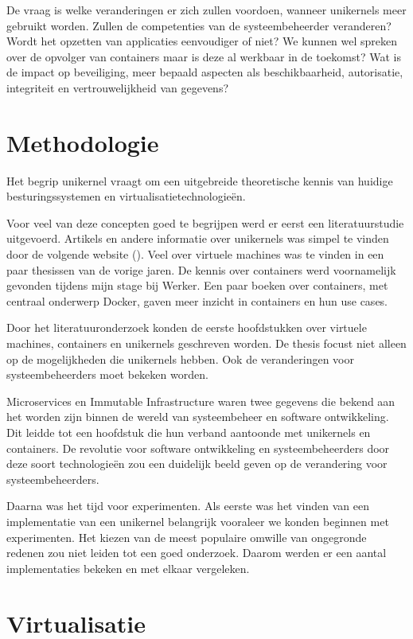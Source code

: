 \documentclass[pdftex,a4paper,12pt,twoside]{report}
\begin{document}
De vraag is welke veranderingen er zich zullen voordoen, wanneer unikernels meer gebruikt worden. Zullen de competenties van de systeembeheerder veranderen? Wordt het opzetten van applicaties eenvoudiger of niet? We kunnen wel spreken over de opvolger van containers maar is deze al werkbaar in de toekomst? Wat is de impact op beveiliging, meer bepaald aspecten als beschikbaarheid, autorisatie, integriteit en vertrouwelijkheid van gegevens?

\chapter{Methodologie}
\label{ch:methodologie}

Het begrip unikernel vraagt om een uitgebreide theoretische kennis van huidige besturingssystemen en virtualisatietechnologieën.

Voor veel van deze concepten goed te begrijpen werd er eerst een literatuurstudie uitgevoerd.
Artikels en andere informatie over unikernels was simpel te vinden door de volgende website (\cite{unikernel_systems_unikernels_2016}). Veel over virtuele machines was te vinden in een paar thesissen van de vorige jaren. De kennis over containers werd voornamelijk gevonden tijdens mijn stage bij Werker. Een paar boeken over containers, met centraal onderwerp Docker, gaven meer inzicht in containers en hun use cases.

Door het literatuuronderzoek konden de eerste hoofdstukken over virtuele machines, containers en unikernels geschreven worden. De thesis focust niet alleen op de mogelijkheden die unikernels hebben. Ook de veranderingen voor systeembeheerders moet bekeken worden.

Microservices en Immutable Infrastructure waren twee gegevens die bekend aan het worden zijn binnen de wereld van systeembeheer en software ontwikkeling. Dit leidde tot een hoofdstuk die hun verband aantoonde met unikernels en containers. De revolutie voor software ontwikkeling en systeembeheerders door deze soort technologieën zou een duidelijk beeld geven op de verandering voor systeembeheerders.

Daarna was het tijd voor experimenten. Als eerste was het vinden van een implementatie van een unikernel belangrijk vooraleer we konden beginnen met experimenten.
Het kiezen van de meest populaire omwille van ongegronde redenen zou niet leiden tot een goed onderzoek. Daarom werden er een aantal implementaties bekeken en met elkaar vergeleken.

\chapter{Virtualisatie}
\label{ch:virtualisatie}
\end{document}
